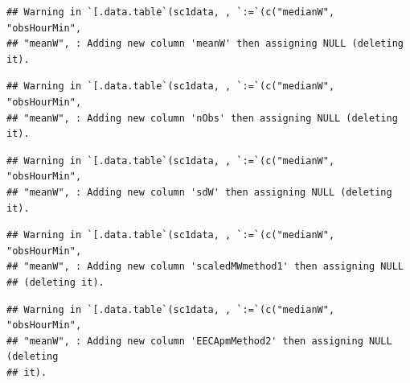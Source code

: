\documentclass[]{article}
\theoremstyle{definition}
\theoremstyle{definition}
\theoremstyle{definition}
\theoremstyle{remark}
\begin{document}
\begin{verbatim}
## Warning in `[.data.table`(sc1data, , `:=`(c("medianW", "obsHourMin",
## "meanW", : Adding new column 'meanW' then assigning NULL (deleting it).
\end{verbatim}

\begin{verbatim}
## Warning in `[.data.table`(sc1data, , `:=`(c("medianW", "obsHourMin",
## "meanW", : Adding new column 'nObs' then assigning NULL (deleting it).
\end{verbatim}

\begin{verbatim}
## Warning in `[.data.table`(sc1data, , `:=`(c("medianW", "obsHourMin",
## "meanW", : Adding new column 'sdW' then assigning NULL (deleting it).
\end{verbatim}

\begin{verbatim}
## Warning in `[.data.table`(sc1data, , `:=`(c("medianW", "obsHourMin",
## "meanW", : Adding new column 'scaledMWmethod1' then assigning NULL
## (deleting it).
\end{verbatim}

\begin{verbatim}
## Warning in `[.data.table`(sc1data, , `:=`(c("medianW", "obsHourMin",
## "meanW", : Adding new column 'EECApmMethod2' then assigning NULL (deleting
## it).
\end{verbatim}
\end{document}
